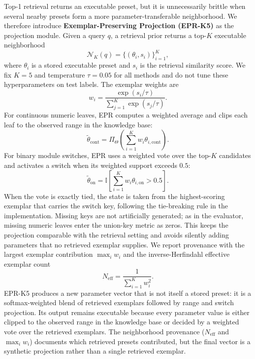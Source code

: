 Top-1 retrieval returns an executable preset, but it is unnecessarily brittle when several nearby presets form a more parameter-transferable neighborhood. We therefore introduce \textbf{Exemplar-Preserving Projection (EPR-K5)} as the projection module. Given a query $q$, a retrieval prior returns a top-$K$ executable neighborhood
\begin{equation}
	\mathcal{N}_K(q)=\{(\theta_i,s_i)\}_{i=1}^{K},
\end{equation}
where $\theta_i$ is a stored executable preset and $s_i$ is the retrieval similarity score. We fix $K=5$ and temperature $\tau=0.05$ for all methods and do not tune these hyperparameters on test labels. The exemplar weights are
\begin{equation}
	w_i=\frac{\exp(s_i/\tau)}{\sum_{j=1}^{K}\exp(s_j/\tau)}.
\end{equation}
For continuous numeric leaves, EPR computes a weighted average and clips each leaf to the observed range in the knowledge base:
\begin{equation}
	\tilde{\theta}_{\mathrm{cont}}=
	\Pi_{\Theta}\left(\sum_{i=1}^{K}w_i\theta_{i,\mathrm{cont}}\right).
\end{equation}
For binary module switches, EPR uses a weighted vote over the top-$K$ candidates and activates a switch when its weighted support exceeds $0.5$:
\begin{equation}
	\tilde{\theta}_{\mathrm{on}}=
	\mathbb{I}\left[\sum_{i=1}^{K}w_i\theta_{i,\mathrm{on}}>0.5\right].
\end{equation}
When the vote is exactly tied, the state is taken from the highest-scoring exemplar that carries the switch key, following the tie-breaking rule in the implementation.
Missing keys are not artificially generated; as in the evaluator, missing numeric leaves enter the union-key metric as zeros. This keeps the projection comparable with the retrieval setting and avoids silently adding parameters that no retrieved exemplar supplies. We report provenance with the largest exemplar contribution $\max_i w_i$ and the inverse-Herfindahl effective exemplar count
\begin{equation}
	N_{\mathrm{eff}}=\frac{1}{\sum_{i=1}^{K}w_i^2}.
\end{equation}
EPR-K5 produces a new parameter vector that is not itself a stored preset: it is a softmax-weighted blend of retrieved exemplars followed by range and switch projection. Its output remains executable because every parameter value is either clipped to the observed range in the knowledge base or decided by a weighted vote over the retrieved exemplars. The neighborhood provenance ($N_{\mathrm{eff}}$ and $\max_i w_i$) documents which retrieved presets contributed, but the final vector is a synthetic projection rather than a single retrieved exemplar.

